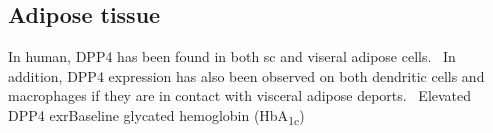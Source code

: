 \subsection{Adipose tissue}
In human, DPP4 has been found in both sc and viseral adipose cells.~\cite{Lamers2011} In addition, DPP4 expression has also been observed on both dendritic cells and macrophages if they are in contact with visceral adipose deports.~\cite{Zhong2013} Elevated DPP4 exrBaseline glycated hemoglobin (HbA\textsubscript{1c}) 